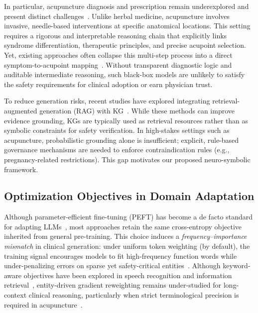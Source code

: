 \documentclass[preprint,5p,times,twocolumn,fleqn]{elsarticle}
\begin{document}
In particular, acupuncture diagnosis and prescription remain underexplored and present distinct challenges~\citep{cheng_tcm-eval_2025,huang_tcm-3ceval_2025}. 
Unlike herbal medicine, acupuncture involves invasive, needle-based interventions at specific anatomical locations. 
This setting requires a rigorous and interpretable reasoning chain that explicitly links syndrome differentiation, therapeutic principles, and precise acupoint selection. 
Yet, existing approaches often collapse this multi-step process into a direct symptom-to-acupoint mapping~\citep{li_acukg_2025}. 
Without transparent diagnostic logic and auditable intermediate reasoning, such black-box models are unlikely to satisfy the safety requirements for clinical adoption or earn physician trust.

To reduce generation risks, recent studies have explored integrating retrieval-augmented generation (RAG) with KG~\citep{he_opentcm_2025}. 
While these methods can improve evidence grounding, KGs are typically used as retrieval resources rather than as symbolic constraints for safety verification. 
In high-stakes settings such as acupuncture, probabilistic grounding alone is insufficient; explicit, rule-based governance mechanisms are needed to enforce contraindication rules (e.g., pregnancy-related restrictions). 
This gap motivates our proposed neuro-symbolic framework.

\subsection{Optimization Objectives in Domain Adaptation}

Although parameter-efficient fine-tuning (PEFT) has become a de facto standard for adapting LLMs~\citep{houlsby_adapters_2019,hu_lora_2022,dettmers_qlora_2023}, most approaches retain the same cross-entropy objective inherited from general pre-training. 
This choice induces a \textit{frequency--importance mismatch} in clinical generation: under uniform token weighting (by default), the training signal encourages models to fit high-frequency function words while under-penalizing errors on sparse yet safety-critical entities~\citep{lin_focal_loss_2017,cui_class_balanced_2019}. 
Although keyword-aware objectives have been explored in speech recognition and information retrieval~\citep{pineiro_weighted_ce_asr_2024,gandhe_optimization_2014,kwok_improving_2025}, entity-driven gradient reweighting remains under-studied for long-context clinical reasoning, particularly when strict terminological precision is required in acupuncture~\citep{zhang_show_2023}.
\end{document}
